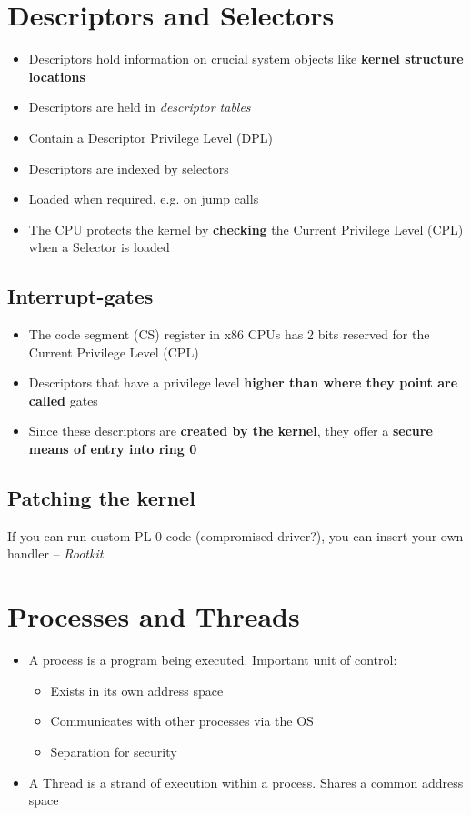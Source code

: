 \documentclass{article}
\begin{document}
\section{Descriptors and Selectors}
\begin{itemize}
  \item Descriptors hold information on crucial system objects like \textbf{kernel structure locations} 
  \item Descriptors are held in \textit{descriptor tables} 
  \item Contain a Descriptor Privilege Level (DPL) 
  \item Descriptors are indexed by selectors 
  \item Loaded when required, e.g. on jump calls 
  \item The CPU protects the kernel by \textbf{checking} the Current Privilege Level (CPL) when a Selector is loaded
\end{itemize}

\subsection{Interrupt-gates}
\begin{itemize}
  \item The code segment (CS) register in x86 CPUs has 2 bits reserved for the Current Privilege Level (CPL) 
  \item Descriptors that have a privilege level \textbf{higher than where they point are called} gates 
  \item Since these descriptors are \textbf{created by the kernel}, they offer a \textbf{secure means of entry into ring 0}
\end{itemize}

\subsection{Patching the kernel}
\begin{flushleft}
If you can run custom PL 0 code (compromised driver?), you can insert your own handler – \textit{Rootkit}
\end{flushleft}

\section{Processes and Threads}
\begin{itemize}
  \item A process is a program being executed. Important unit of control: 
  \begin{itemize}
    \item Exists in its own address space 
    \item Communicates with other processes via the OS 
    \item Separation for security 
  \end{itemize}
  \item A Thread is a strand of execution within a process. Shares a common address space
\end{itemize}
\end{document}
